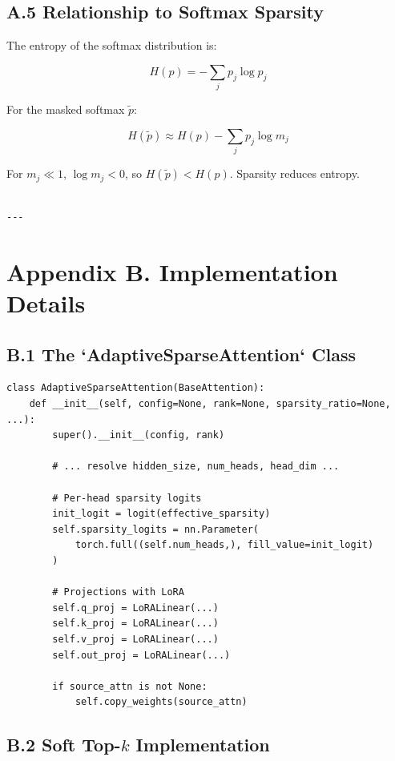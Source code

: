 \subsection{A.5 Relationship to Softmax Sparsity}

The entropy of the softmax distribution is:

\[
H(p) = -\sum_j p_j \log p_j
\]

For the masked softmax $\tilde{p}$:

\[
H(\tilde{p}) \approx H(p) - \sum_j p_j \log m_j
\]

For $m_j \ll 1$, $\log m_j < 0$, so $H(\tilde{p}) < H(p)$. Sparsity reduces 
entropy.
\begin{lstlisting}

---
\end{lstlisting}


\section{Appendix B. Implementation Details}

\subsection{B.1 The `AdaptiveSparseAttention` Class}

\begin{lstlisting}
class AdaptiveSparseAttention(BaseAttention):
    def __init__(self, config=None, rank=None, sparsity_ratio=None, ...):
        super().__init__(config, rank)
        
        # ... resolve hidden_size, num_heads, head_dim ...
        
        # Per-head sparsity logits
        init_logit = logit(effective_sparsity)
        self.sparsity_logits = nn.Parameter(
            torch.full((self.num_heads,), fill_value=init_logit)
        )
        
        # Projections with LoRA
        self.q_proj = LoRALinear(...)
        self.k_proj = LoRALinear(...)
        self.v_proj = LoRALinear(...)
        self.out_proj = LoRALinear(...)
        
        if source_attn is not None:
            self.copy_weights(source_attn)
\end{lstlisting}

\subsection{B.2 Soft Top-$k$ Implementation}

